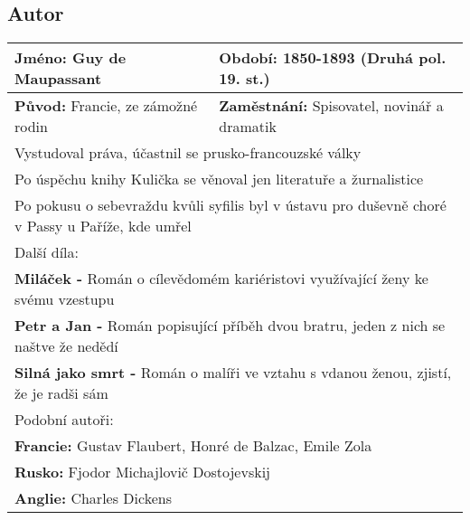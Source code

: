 \subsection*{Autor}
\begin{tabularx}{\linewidth}{l|l}
    \textbf{Jméno:} Guy de Maupassant         & \textbf{Období:} 1850-1893 (Druhá pol. 19. st.)                         \\
    \hline
    \textbf{Původ:} Francie, ze zámožné rodin & \textbf{Zaměstnání:} Spisovatel, novinář a dramatik                     \\
    \hline
    \multicolumn{2}{l}{Vystudoval práva, účastnil se prusko-francouzské války}                                          \\
    \multicolumn{2}{l}{Po úspěchu knihy Kulička se věnoval jen literatuře a žurnalistice}                               \\
    \multicolumn{2}{l}{Po pokusu o sebevraždu kvůli syfilis byl v ústavu pro duševně choré v Passy u Paříže, kde umřel} \\
    \hline
    \multicolumn{2}{l}{Další díla:}                                                                                     \\
    \multicolumn{2}{l}{\textbf{Miláček -} Román o cílevědomém kariéristovi využívající ženy ke svému vzestupu}          \\
    \multicolumn{2}{l}{\textbf{Petr a Jan -} Román popisující příběh dvou bratru, jeden z nich se naštve že nedědí}     \\
    \multicolumn{2}{l}{\textbf{Silná jako smrt -} Román o malíři ve vztahu s vdanou ženou, zjistí, že je radši sám}     \\
    \hline
    \multicolumn{2}{l}{Podobní autoři:}                                                                                 \\
    \multicolumn{2}{l}{\textbf{Francie:} Gustav Flaubert, Honré de Balzac, Emile Zola}                                  \\
    \multicolumn{2}{l}{\textbf{Rusko:} Fjodor Michajlovič Dostojevskij}                                                 \\
    \multicolumn{2}{l}{\textbf{Anglie:} Charles Dickens}                                                                \\
\end{tabularx}